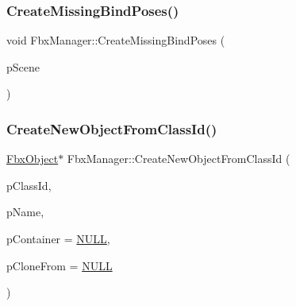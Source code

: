 \subsubsection{\texorpdfstring{Create\+Missing\+Bind\+Poses()}{CreateMissingBindPoses()}}
{\footnotesize\ttfamily void Fbx\+Manager\+::\+Create\+Missing\+Bind\+Poses (\begin{DoxyParamCaption}\item[{\hyperlink{class_fbx_scene}{Fbx\+Scene} $\ast$}]{p\+Scene }\end{DoxyParamCaption})}

\mbox{\label{class_fbx_manager_a8e89142d374a3a06c406c62d6a204415}} 
\subsubsection{\texorpdfstring{Create\+New\+Object\+From\+Class\+Id()}{CreateNewObjectFromClassId()}}
{\footnotesize\ttfamily \hyperlink{class_fbx_object}{Fbx\+Object}$\ast$ Fbx\+Manager\+::\+Create\+New\+Object\+From\+Class\+Id (\begin{DoxyParamCaption}\item[{\hyperlink{class_fbx_class_id}{Fbx\+Class\+Id}}]{p\+Class\+Id,  }\item[{const char $\ast$}]{p\+Name,  }\item[{\hyperlink{class_fbx_object}{Fbx\+Object} $\ast$}]{p\+Container = {\ttfamily \hyperlink{fbxarch_8h_a070d2ce7b6bb7e5c05602aa8c308d0c4}{N\+U\+LL}},  }\item[{const \hyperlink{class_fbx_object}{Fbx\+Object} $\ast$}]{p\+Clone\+From = {\ttfamily \hyperlink{fbxarch_8h_a070d2ce7b6bb7e5c05602aa8c308d0c4}{N\+U\+LL}} }\end{DoxyParamCaption})}

